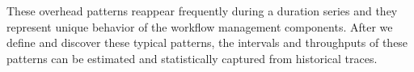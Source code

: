 


These overhead patterns reappear frequently during a duration series and they represent unique behavior of the workflow management components. After we define and discover these typical patterns, the intervals and throughputs of these patterns can be estimated and statistically captured from historical traces. 









